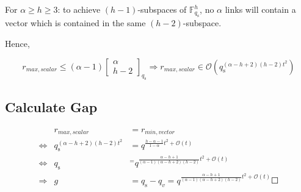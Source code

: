 For $\alpha\geq h\geq3$: to achieve $(h-1)$-subspaces of $\ensuremath{\mathbb{F}}_{q_{\mathrm{s}}}^{h}$,
no $\alpha$ links will contain a vector which is contained in the
same $(h-2)$-subspace.

Hence,

\[
r_{max,scalar}\leq\left(\alpha-1\right)\left[\begin{array}{c}
\alpha\\
h-2
\end{array}\right]_{q_{\mathrm{s}}}\Rightarrow r_{max,scalar}\in\mathcal{O}\left(q_{\mathrm{s}}^{\left(\alpha-h+2\right)\left(h-2\right)t^{2}}\right)
\]


\subsection{Calculate Gap }

\begin{eqnarray*}
 & r_{max,scalar} & =r_{min,vector}\\
\Leftrightarrow & q_{\mathrm{s}}^{\left(\alpha-h+2\right)\left(h-2\right)t^{2}} & =q^{\frac{h-\alpha-1}{1-\alpha}t^{2}+\mathcal{O}(t)}\\
\Leftrightarrow & q_{\mathrm{s}} & ^{=}q^{\frac{\alpha-h+1}{\left(\alpha-1\right)\left(\alpha-h+2\right)\left(h-2\right)}t^{2}+\mathcal{O}(t)}\\
\Rightarrow & g & =q_{\mathrm{s}}-q_{v}=q^{\frac{\alpha-h+1}{\left(\alpha-1\right)\left(\alpha-h+2\right)\left(h-2\right)}t^{2}+\mathcal{O}(t)}\Square
\end{eqnarray*}

\clearpage